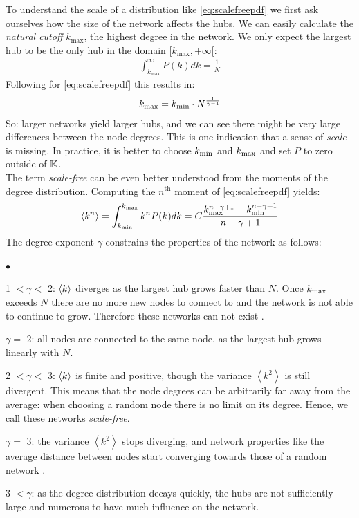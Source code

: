 To understand the scale of a distribution like \eqref{eq:scalefreepdf} we first ask ourselves how the size of the network affects the hubs. We can easily calculate the \textit{natural cutoff} $k_{\text{max}}$, the highest degree in the network. We only expect the largest hub to be the only hub in the domain $[k_{\text{max}}, +\infty[$:
\begin{align*}
\int_{k_{\text{max}}}^{\infty} P(k) dk=\frac{1}{N}
\end{align*}
Following \cite{BarabasiNetworkBook2016} for \eqref{eq:scalefreepdf} this results in:
\begin{align}
k_{\text{max}} = k_{\text{min}} \cdot N^{\frac{1}{\gamma-1}} \label{eq:scalefreecutoff}
\end{align}
So: larger networks yield larger hubs, and we can see there might be very large differences between the node degrees. This is one indication that a sense of \textsl{scale} is missing. In practice, it is better to choose $k_{\text{min}}$ and $k_{\text{max}}$ and set $P$ to zero outside of ${\mathbb{K}}$. \\

The term \textsl{scale-free} can be even better understood from the moments of the degree distribution. Computing the $n^{\text{th}}$ moment of \eqref{eq:scalefreepdf} yields:
\begin{align}
\left\langle k^{n}\right\rangle=\int_{\kmin}^{\kmax} k^{n} P(k) d k=C \frac{\kmax^{n-\gamma+1} - \kmin^{n-\gamma+1}}{n-\gamma+1}
\end{align}
The degree exponent $\gamma$ constrains the properties of the network as follows:
\begin{list}{$\bullet$}{}  
\item 1 $< \gamma <$ 2: ${\langle k\rangle}$ diverges as the largest hub grows faster than $N$. Once $k_{\text{max}}$ exceeds $N$ there are no more new nodes to connect to and the network is not able to continue to grow. Therefore these networks can not exist \cite{Bassler2011, BarabasiNetworkBook2016}.
\item $\gamma =$ 2: all nodes are connected to the same node, as the largest hub grows linearly with $N$.
\item 2 $< \gamma < $ 3: ${\langle k\rangle}$ is finite and positive, though the variance $\left\langle k^{2}\right\rangle$ is still divergent. This means that the node degrees can be arbitrarily far away from the average: when choosing a random node there is no limit on its degree. Hence, we call these networks \textsl{scale-free}.
\item $ \gamma = $ 3: the variance $\left\langle k^{2}\right\rangle$ stops diverging, and network properties like the average distance between nodes start converging towards those of a random network \cite{BarabasiNetworkBook2016}.
\item 3 $< \gamma$: as the degree distribution decays quickly, the hubs are not sufficiently large and numerous to have much influence on the network. 
\end{list}

